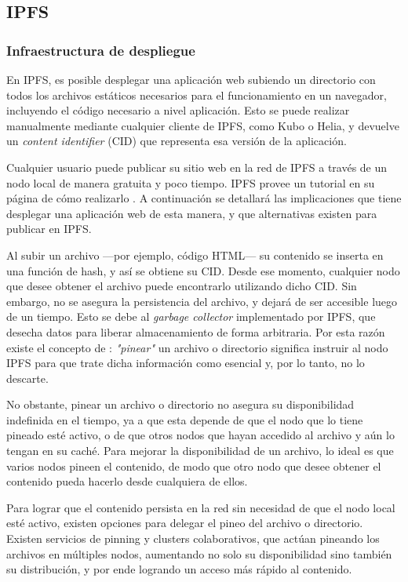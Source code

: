 \subsection{IPFS}

\subsubsection{Infraestructura de despliegue}

En IPFS, es posible desplegar una aplicación web subiendo un directorio con todos los archivos estáticos necesarios para el funcionamiento en un navegador, incluyendo el código necesario a nivel aplicación. Esto se puede realizar manualmente mediante cualquier cliente de IPFS, como Kubo\cite{kubo} o Helia\cite{helia}, y devuelve un \textit{content identifier} (CID) \cite{cid} que representa esa versión de la aplicación.

Cualquier usuario puede publicar su sitio web en la red de IPFS a través de un nodo local de manera gratuita y poco tiempo. IPFS provee un tutorial en su página de cómo realizarlo \cite{ipfs-static-website}. A continuación se detallará las implicaciones que tiene desplegar una aplicación web de esta manera, y que alternativas existen para publicar en IPFS.

Al subir un archivo —por ejemplo, código HTML— su contenido se inserta en una función de hash, y así se obtiene su CID. Desde ese momento, cualquier nodo que desee obtener el archivo puede encontrarlo utilizando dicho CID. Sin embargo, no se asegura la persistencia del archivo, y dejará de ser accesible luego de un tiempo. Esto se debe al \textit{garbage collector} \cite{garbage-collector} implementado por IPFS, que desecha datos para liberar almacenamiento de forma arbitraria. Por esta razón existe el concepto de \cite{pinning}: \textit{"pinear"} un archivo o directorio significa instruir al nodo IPFS para que trate dicha información como esencial y, por lo tanto, no lo descarte. 

No obstante, pinear un archivo o directorio no asegura su disponibilidad indefinida en el tiempo, ya a que esta depende de que el nodo que lo tiene pineado esté activo, o de que otros nodos que hayan accedido al archivo y aún lo tengan en su caché. Para mejorar la disponibilidad de un archivo, lo ideal es que varios nodos pineen el contenido, de modo que otro nodo que desee obtener el contenido pueda hacerlo desde cualquiera de ellos.

Para lograr que el contenido persista en la red sin necesidad de que el nodo local esté activo, existen opciones para delegar el pineo del archivo o directorio. Existen servicios de pinning y clusters colaborativos, que actúan pineando los archivos en múltiples nodos, aumentando no solo su disponibilidad sino también su distribución, y por ende logrando un acceso más rápido al contenido.

